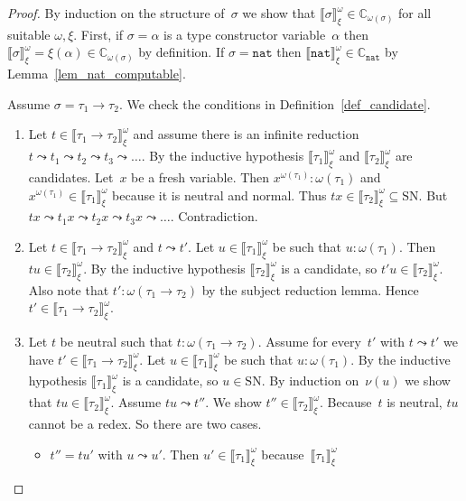 \documentclass[a4paper,UKenglish,cleveref,autoref,numberwithinsect]{lipics-v2019}
\theoremstyle{definition}
\newcommand{\arrtype}{\rightarrow}
\newcommand{\arrW}{\leadsto}
\newcommand{\nat}{\mathtt{nat}}
\newcommand{\SN}{\mathrm{SN}}
\newcommand{\Cb}{\mathbb{C}}
\newcommand{\val}[3]{\ensuremath{\llbracket#1\rrbracket_{#2}^{#3}}}
\begin{document}
\begin{proof}
  By induction on the structure of~$\sigma$ we show that
  $\val{\sigma}{\xi}{\omega} \in \Cb_{\omega(\sigma)}$ for all
  suitable $\omega,\xi$. First, if $\sigma = \alpha$ is a type
  constructor variable~$\alpha$ then $\val{\sigma}{\xi}{\omega} =
  \xi(\alpha) \in \Cb_{\omega(\sigma)}$ by definition. If $\sigma =
  \nat$ then $\val{\nat}{\xi}{\omega} \in \Cb_{\nat}$ by
  Lemma~\ref{lem_nat_computable}.

  Assume $\sigma = \tau_1 \arrtype \tau_2$. We check the conditions in
  Definition~\ref{def_candidate}.
  \begin{enumerate}
  \item Let $t \in \val{\tau_1\arrtype\tau_2}{\xi}{\omega}$ and assume
    there is an infinite reduction $t \arrW t_1 \arrW t_2
    \arrW t_3 \arrW \ldots$. By the inductive hypothesis
    $\val{\tau_1}{\xi}{\omega}$ and $\val{\tau_2}{\xi}{\omega}$ are
    candidates. Let~$x$ be a fresh variable. Then $x^{\omega(\tau_1)}
    : \omega(\tau_1)$ and $x^{\omega(\tau_1)} \in
    \val{\tau_1}{\xi}{\omega}$ because it is neutral and normal. Thus
    $t x \in \val{\tau_2}{\xi}{\omega} \subseteq \SN$. But $t x
    \arrW t_1 x \arrW t_2 x \arrW t_3 x \arrW
    \ldots$. Contradiction.
  \item Let $t \in \val{\tau_1\arrtype\tau_2}{\xi}{\omega}$ and $t
    \arrW t'$. Let $u \in \val{\tau_1}{\xi}{\omega}$ be such that
    $u : \omega(\tau_1)$. Then $t u \in \val{\tau_2}{\xi}{\omega}$. By
    the inductive hypothesis $\val{\tau_2}{\xi}{\omega}$ is a
    candidate, so $t' u \in \val{\tau_2}{\xi}{\omega}$. Also note that
    $t' : \omega(\tau_1 \arrtype \tau_2)$ by the subject reduction
    lemma. Hence $t' \in \val{\tau_1\arrtype\tau_2}{\xi}{\omega}$.
  \item Let $t$ be neutral such that $t : \omega(\tau_1 \arrtype
    \tau_2)$. Assume for every~$t'$ with $t \arrW t'$ we have $t'
    \in \val{\tau_1\arrtype\tau_2}{\xi}{\omega}$. Let $u \in
    \val{\tau_1}{\xi}{\omega}$ be such that $u : \omega(\tau_1)$. By
    the inductive hypothesis $\val{\tau_1}{\xi}{\omega}$ is a
    candidate, so $u \in \SN$. By induction on~$\nu(u)$ we show that
    $t u \in \val{\tau_2}{\xi}{\omega}$. Assume $t u \arrW t''$. We
    show $t'' \in \val{\tau_2}{\xi}{\omega}$. Because~$t$ is neutral,
    $t u$ cannot be a redex. So there are two cases.
    \begin{itemize}
    \item $t'' = t u'$ with $u \arrW u'$. Then $u' \in
      \val{\tau_1}{\xi}{\omega}$ because~$\val{\tau_1}{\xi}{\omega}$

\end{itemize}
\end{enumerate}
\end{proof}
\end{document}
